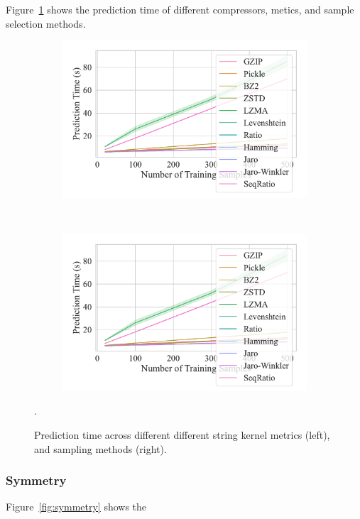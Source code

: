 \documentclass[sigconf]{acmart}
\begin{document}
Figure~\ref{fig:prediction_time} shows the prediction time of different compressors, metics, and sample selection methods.
\begin{figure}
	\begin{subfigure}
		\centering
		\includegraphics[width=.46\textwidth]{figs/truthseeker/metric_vs_predict_time.pdf}
	\end{subfigure}
	~
	\begin{subfigure}
		\centering
		\includegraphics[width=.46\textwidth]{figs/truthseeker/metric_vs_predict_time.pdf}
	\end{subfigure}
	\caption{Prediction time across different different string kernel metrics (left), and sampling methods (right).}.
	\label{fig:prediction_time}
 
\end{figure}

\subsubsection{Symmetry}

Figure~\ref{fig:symmetry} shows the 
\end{document}
